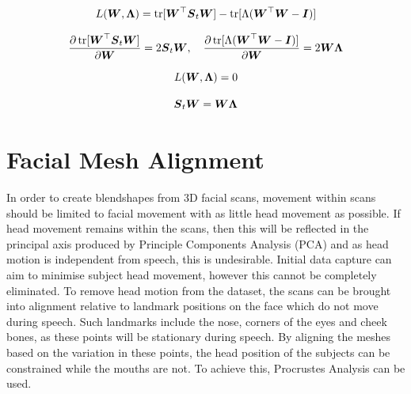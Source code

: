 \begin{equation*}
    L({\boldsymbol{{W}}}, {\boldsymbol{{\Lambda}}}) = \operatorname{tr}[{\boldsymbol{{W}}}^\top {\boldsymbol{{S}}}_t {\boldsymbol{{W}}}] - \operatorname{tr}[\Lambda({\boldsymbol{{W}}}^\top {\boldsymbol{{W}}} - {\boldsymbol{{I}}})]
\end{equation*}

\begin{equation*}
    \frac{\partial \operatorname{tr}[{\boldsymbol{{W}}}^\top {\boldsymbol{{S}}}_t {\boldsymbol{{W}}}]}{\partial {\boldsymbol{{W}}}} = 2 {\boldsymbol{{S}}}_t {\boldsymbol{{W}}},
    \quad
    \frac{\partial \operatorname{tr}[\Lambda({\boldsymbol{{W}}}^\top {\boldsymbol{{W}}} - {\boldsymbol{{I}}})]}{\partial {\boldsymbol{{W}}}} = 2 {\boldsymbol{{W \Lambda}}}
\end{equation*}

\begin{equation*}
    L({\boldsymbol{{W}}}, {\boldsymbol{{\Lambda}}}) = 0 
\end{equation*}

\begin{equation} \label{eq:pca_solved}
    {\boldsymbol{{S}}}_t {\boldsymbol{{W}}} = {\boldsymbol{{W \Lambda}}}
\end{equation}

\section{Facial Mesh Alignment}
In order to create blendshapes from 3D facial scans, movement within scans should be limited to facial movement with as little head movement as possible.
If head movement remains within the scans, then this will be reflected in the principal axis produced by Principle Components Analysis (PCA) and as head motion is independent from speech, this is undesirable.
Initial data capture can aim to minimise subject head movement, however this cannot be completely eliminated.
To remove head motion from the dataset, the scans can be brought into alignment relative to landmark positions on the face which do not move during speech.
Such landmarks include the nose, corners of the eyes and cheek bones, as these points will be stationary during speech.
By aligning the meshes based on the variation in these points, the head position of the subjects can be constrained while the mouths are not.
To achieve this, Procrustes Analysis can be used.

